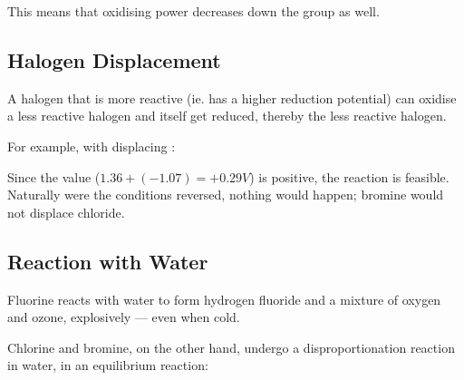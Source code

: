 			This means that oxidising power decreases down the group as well.



		\subsection{Halogen Displacement}

			A halogen that is more reactive (ie. has a higher reduction potential) can oxidise a less reactive halogen and itself get reduced,
			thereby  the less reactive halogen.

			For example, with  displacing :


			Since the \Ecell{} value ($1.36 + (-1.07) = +0.29V$) is positive, the reaction is feasible. Naturally were the conditions reversed,
			nothing would happen; bromine would not displace chloride.





		\subsection{Reaction with Water}

			Fluorine reacts with water to form hydrogen fluoride and a mixture of oxygen and ozone, explosively --- even when cold.



			Chlorine and bromine, on the other hand, undergo a disproportionation reaction in water, in an equilibrium reaction:



